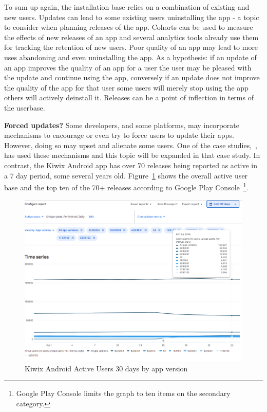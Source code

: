 To sum up again, the installation base relies on a combination of existing and new users. Updates can lead to some existing users uninstalling the app - a topic to consider when planning releases of the app. Cohorts can be used to measure the effects of new releases of an app and several analytics tools already use them for tracking the retention of new users. Poor quality of an app may lead to more uses abandoning and even uninstalling the app. As a hypothesis: if an update of an app improves the quality of an app for a user the user may be pleased with the update and continue using the app, conversely if an update does not improve the quality of the app for that user some users will merely stop using the app others will actively deinstall it. Releases can be a point of inflection in terms of the userbase.

\textbf{Forced updates?} Some developers, and some platforms, may incorporate mechanisms to encourage or even try to force users to update their apps. However, doing so may upset and alienate some users. One of the case studies,~\href{section-greentech-apps}{\emph{}}, has used these mechanisms and this topic will be expanded in that case study. In contrast, the Kiwix Android app has over 70 releases being reported as active in a 7 day period, some several years old. Figure~\ref{fig:kiwix-30d-active-users} shows the overall active user base and the top ten of the 70+ releases according to Google Play Console~\footnote{Google Play Console limits the graph to ten items on the secondary category.}.

\begin{figure}[htbp!]
    \centering
    \includegraphics[width=15.5cm]{images/android-vitals-screenshots/kiwix-ActiveUsers-30-days-2020-10-29.png}
    \caption{Kiwix Android Active Users 30 days by app version}
    \label{fig:kiwix-30d-active-users}
\end{figure}

